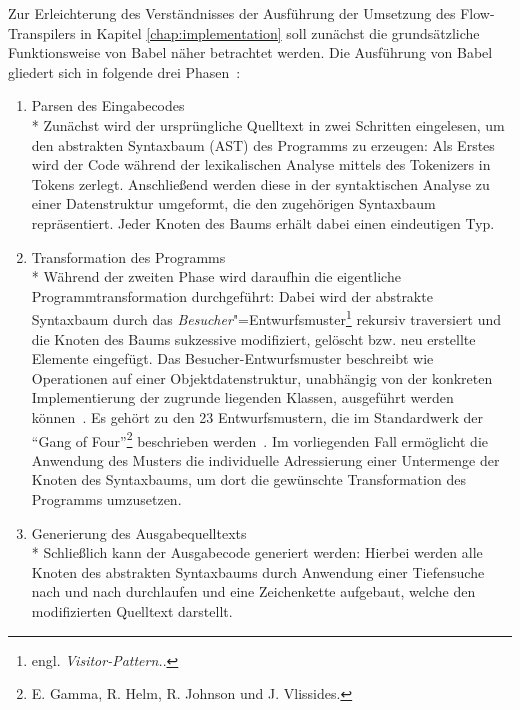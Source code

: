 Zur Erleichterung des Verständnisses der Ausführung der Umsetzung des Flow-Transpilers in Kapitel \ref{chap:implementation} soll zunächst die grundsätzliche Funktionsweise von Babel näher betrachtet werden. Die Ausführung von Babel gliedert sich in folgende drei Phasen~\autocite{BABEL:HANDBOOK}:

\begin{enumerate}
  \item {\libertineSB Parsen des Eingabecodes}\\*
    Zunächst wird der ursprüngliche Quelltext in zwei Schritten eingelesen, um den abstrakten Syntaxbaum (AST) des Programms zu erzeugen: Als Erstes wird der Code während der lexikalischen Analyse mittels des Tokenizers in Tokens zerlegt. Anschließend werden diese in der syntaktischen Analyse zu einer Datenstruktur umgeformt, die den zugehörigen Syntaxbaum repräsentiert. Jeder Knoten des Baums erhält dabei einen eindeutigen Typ.
    \\

  \item {\libertineSB Transformation des Programms}\\*
    Während der zweiten Phase wird daraufhin die eigentliche Programmtransformation durchgeführt: Dabei wird der abstrakte Syntaxbaum durch das \emph{Besucher}"=Entwurfsmuster\footnote{engl. \textit{Visitor-Pattern.}.} rekursiv traversiert und die Knoten des Baums sukzessive modifiziert, gelöscht bzw. neu erstellte Elemente eingefügt. Das Besucher-Entwurfsmuster beschreibt wie Operationen auf einer Objektdatenstruktur, unabhängig von der konkreten Implementierung der zugrunde liegenden Klassen, ausgeführt werden können~\autocite[634\psq]{Freeman:2004}. Es gehört zu den 23 Entwurfsmustern, die im Standardwerk  der \enquote{Gang of Four}\footnote{E. Gamma, R. Helm, R. Johnson und J. Vlissides.} beschrieben werden~\autocite[306\psqq]{GAMMA:1994}. Im vorliegenden Fall ermöglicht die Anwendung des Musters die individuelle Adressierung einer Untermenge der Knoten des Syntaxbaums, um dort die gewünschte Transformation des Programms umzusetzen.
    \\

  \item {\libertineSB Generierung des Ausgabequelltexts}\\*
    Schließlich kann der Ausgabecode generiert werden: Hierbei werden alle Knoten des abstrakten Syntaxbaums durch Anwendung einer Tiefensuche nach und nach durchlaufen und eine Zeichenkette aufgebaut, welche den modifizierten Quelltext darstellt.
\end{enumerate}

